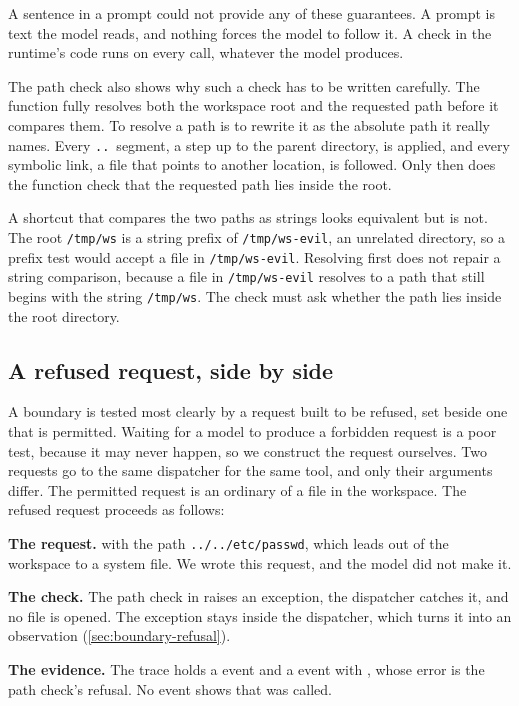 A sentence in a prompt could not provide any of these guarantees. A prompt is text the model reads,
and nothing forces the model to follow it. A check in the runtime's code runs on every call, whatever
the model produces.

The path check also shows why such a check has to be written carefully. The function
 fully resolves both the workspace root and the requested path before it
compares them. To resolve a path is to rewrite it as the absolute path it really names. Every
\texttt{..}\ segment, a step up to the parent directory, is applied, and every symbolic link, a file
that points to another location, is followed. Only then does the function check that the requested
path lies inside the root.

A shortcut that compares the two paths as strings looks equivalent but is not. The root
\texttt{/tmp/ws} is a string prefix of \texttt{/tmp/ws-evil}, an unrelated directory, so a prefix
test would accept a file in \texttt{/tmp/ws-evil}. Resolving first does not repair a string
comparison, because a file in \texttt{/tmp/ws-evil} resolves to a path that still begins with the
string \texttt{/tmp/ws}. The check must ask whether the path lies inside the root directory.

\subsection{A refused request, side by side}
\label{sec:boundary-refused}

A boundary is tested most clearly by a request built to be refused, set beside one that is permitted.
Waiting for a model to produce a forbidden request is a poor test, because it may never happen, so we
construct the request ourselves. Two requests go to the same dispatcher for the same tool, and only
their arguments differ. The permitted request is an ordinary  of a file in the
workspace. The refused request proceeds as follows:
\bi
\item \textbf{The request.}  with the path \texttt{../../etc/passwd}, which leads
out of the workspace to a system file. We wrote this request, and the model did not make it.
\item \textbf{The check.} The path check in  raises an exception, the
dispatcher catches it, and no file is opened. The exception stays inside the dispatcher, which turns
it into an observation (\cref{sec:boundary-refusal}).
\item \textbf{The evidence.} The trace holds a  event and a
 event with , whose error is the path check's refusal. No
event shows that  was called.
\ei

